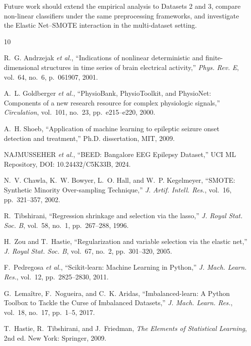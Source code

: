 \documentclass[conference]{IEEEtran}
\begin{document}
Future work should extend the empirical analysis to Datasets 2 and 3,
compare non-linear classifiers under the same preprocessing frameworks,
and investigate the Elastic Net--SMOTE interaction in the multi-dataset
setting.

\begin{thebibliography}{10}

R.~G. Andrzejak \emph{et al.},
``Indications of nonlinear deterministic and finite-dimensional
structures in time series of brain electrical activity,''
\emph{Phys. Rev. E}, vol.~64, no.~6, p.~061907, 2001.

A.~L. Goldberger \emph{et al.},
``PhysioBank, PhysioToolkit, and PhysioNet: Components of a new
research resource for complex physiologic signals,''
\emph{Circulation}, vol.~101, no.~23, pp.~e215--e220, 2000.

A.~H. Shoeb,
``Application of machine learning to epileptic seizure onset detection
and treatment,'' Ph.D. dissertation, MIT, 2009.

NAJMUSSEHER \emph{et al.},
``BEED: Bangalore EEG Epilepsy Dataset,''
UCI ML Repository, DOI: 10.24432/C5K33B, 2024.

N.~V. Chawla, K.~W. Bowyer, L.~O. Hall, and W.~P. Kegelmeyer,
``SMOTE: Synthetic Minority Over-sampling Technique,''
\emph{J. Artif. Intell. Res.}, vol.~16, pp.~321--357, 2002.

R.~Tibshirani,
``Regression shrinkage and selection via the lasso,''
\emph{J. Royal Stat. Soc. B}, vol.~58, no.~1, pp.~267--288, 1996.

H.~Zou and T.~Hastie,
``Regularization and variable selection via the elastic net,''
\emph{J. Royal Stat. Soc. B}, vol.~67, no.~2, pp.~301--320, 2005.

F.~Pedregosa \emph{et al.},
``Scikit-learn: Machine Learning in Python,''
\emph{J. Mach. Learn. Res.}, vol.~12, pp.~2825--2830, 2011.

G.~Lema\^{i}tre, F.~Nogueira, and C.~K. Aridas,
``Imbalanced-learn: A Python Toolbox to Tackle the Curse of Imbalanced
Datasets,''
\emph{J. Mach. Learn. Res.}, vol.~18, no.~17, pp.~1--5, 2017.

T.~Hastie, R.~Tibshirani, and J.~Friedman,
\emph{The Elements of Statistical Learning}, 2nd ed.
New York: Springer, 2009.

\end{thebibliography}
\end{document}

